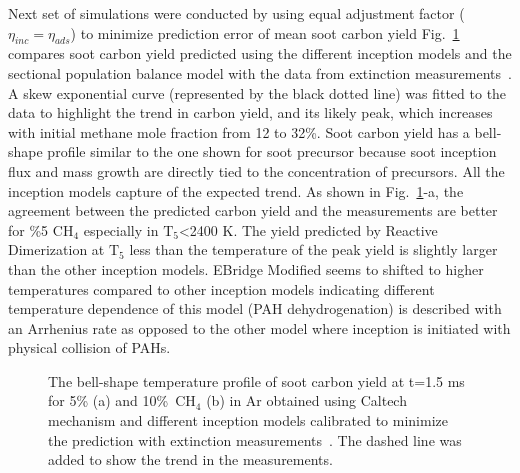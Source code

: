 Next set of simulations were conducted by using equal adjustment factor ($\eta_{inc}=\eta_{ads}$) to minimize prediction error of mean soot carbon yield
Fig.~\ref{fig:shockagof_yield_cpr} compares soot carbon yield predicted using the different inception models and the sectional population balance model with the data from extinction measurements~\citep{agafonov2016unified}. A skew exponential curve (represented by the black dotted line) was fitted to the data to highlight the trend in carbon yield, and its likely peak, which increases with initial methane mole fraction from 12 to 32\%. Soot carbon yield has a bell-shape profile similar to the one shown for soot precursor because soot inception flux and mass growth are directly tied to the concentration of precursors. All the inception models capture of the expected trend. As shown in Fig.~\ref{fig:shockagof_yield_cpr}-a, the agreement between the predicted carbon yield and the measurements are better for \%5 $\mathrm{CH_4}$ especially in $\mathrm{T_5}$<2400 K. The yield predicted by Reactive Dimerization at $\mathrm{T_5}$ less than the temperature of the peak yield is slightly larger than the other inception models. EBridge Modified seems to shifted to higher temperatures compared to other inception models indicating different temperature dependence of this model (PAH dehydrogenation) is described with an Arrhenius rate as opposed to the other model where inception is initiated with physical collision of PAHs.

\begin{figure}[H]
	\centering
	\caption{The bell-shape temperature profile of soot carbon yield at t=1.5 ms for 5\% (a) and 10\%~$\mathrm{CH_4}$ (b) in Ar obtained using Caltech mechanism and different inception models calibrated to minimize the prediction with extinction measurements~\citep{agafonov2016unified}. The dashed line was added to show the trend in the measurements.}
	\label{fig:shockagof_yield_cpr} 
\end{figure}


